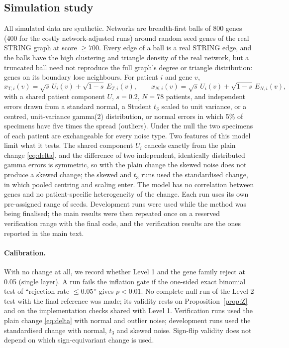 \subsection{Simulation study}\label{sec:simulation}
All simulated data are synthetic. Networks are breadth-first balls of 800 genes (400 for the costly network-adjusted runs) around random seed genes of the real STRING graph at score $\ge700$. Every edge of a ball is a real STRING edge, and the balls have the high clustering and triangle density of the real network, but a truncated ball need not reproduce the full graph's degree or triangle distribution: genes on its boundary lose neighbours. For patient $i$ and gene $v$,
\begin{equation}
x_{T,i}(v)=\sqrt{s}\,U_{i}(v)+\sqrt{1-s}\,E_{T,i}(v),\qquad x_{N,i}(v)=\sqrt{s}\,U_{i}(v)+\sqrt{1-s}\,E_{N,i}(v),
\end{equation}
with a shared patient component $U$, $s=0.2$, $N=78$ patients, and independent errors drawn from a standard normal, a Student $t_3$ scaled to unit variance, or a centred, unit-variance gamma(2) distribution, or normal errors in which 5\% of specimens have five times the spread (outliers). Under the null the two specimens of each patient are exchangeable for every noise type. Two features of this model limit what it tests. The shared component $U_i$ cancels exactly from the plain change \eqref{eq:delta}, and the difference of two independent, identically distributed gamma errors is symmetric, so with the plain change the skewed noise does not produce a skewed change; the skewed and $t_3$ runs used the standardised change, in which pooled centring and scaling enter. The model has no correlation between genes and no patient-specific heterogeneity of the change. Each run uses its own pre-assigned range of seeds. Development runs were used while the method was being finalised; the main results were then repeated once on a reserved verification range with the final code, and the verification results are the ones reported in the main text.

\paragraph{Calibration.} With no change at all, we record whether Level 1 and the gene family reject at 0.05 (single layer). A run fails the inflation gate if the one-sided exact binomial test of ``rejection rate $\le0.05$'' gives $p<0.01$. No complete-null run of the Level 2 test with the final reference was made; its validity rests on Proposition~\ref{prop:Z} and on the implementation checks shared with Level 1. Verification runs used the plain change \eqref{eq:delta} with normal and outlier noise; development runs used the standardised change with normal, $t_3$ and skewed noise. Sign-flip validity does not depend on which sign-equivariant change is used.

